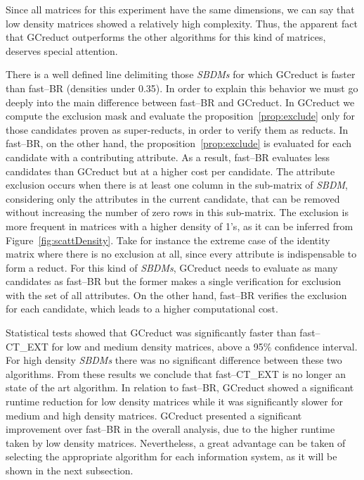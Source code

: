 \documentclass[authoryear,preprint,review,12pt]{elsarticle}
\begin{document}
	Since all matrices for this experiment have the same dimensions, we can say that low density
	matrices showed a relatively high complexity. Thus, the apparent fact that GCreduct outperforms 
	the other algorithms for this kind of matrices, deserves special attention. 
		
	There is a well defined line delimiting those \textit{SBDMs} for which GCreduct is faster than fast--BR (densities under 0.35). In order to explain this behavior we must go deeply into the main difference between fast--BR and GCreduct. In GCreduct we compute the exclusion mask and evaluate the proposition~\ref{prop:exclude} only for those candidates proven as super-reducts, in order to verify them as reducts. In fast--BR, on the other hand, the proposition~\ref{prop:exclude} is evaluated for each candidate with a contributing attribute. As a result, fast--BR evaluates less candidates than GCreduct but at a higher cost per candidate. The attribute exclusion occurs when there is at least one column in the sub-matrix of \textit{SBDM}, considering only the attributes in the current candidate, that can be removed without increasing the number of zero rows in this sub-matrix. The exclusion is more frequent in matrices with a higher density of 1's, as it can be inferred from  Figure~\ref{fig:scattDensity}. Take for instance the extreme case of the identity matrix where there is no exclusion at all, since every attribute is indispensable to form a reduct. For this kind of \textit{SBDMs}, GCreduct needs to evaluate as many candidates as fast--BR but the former makes a single verification for exclusion with the set of all attributes. On the other hand, fast--BR verifies the exclusion for each candidate, which leads to a higher computational cost.
	
	Statistical tests showed that GCreduct was significantly faster than fast--CT\_EXT for low and medium density matrices, above a 95\% confidence interval. For high density \textit{SBDMs} there was no significant difference between these two algorithms. From these results we conclude that fast--CT\_EXT is no longer an state of the art algorithm. In relation to fast--BR, GCreduct showed a significant runtime reduction for low density matrices while it was significantly slower for medium and high density matrices. GCreduct presented a significant improvement over fast--BR in the overall analysis, due to the higher runtime taken by low density matrices. Nevertheless, a great advantage can be taken of selecting the appropriate algorithm for each information system, as it will be shown in the next subsection. 
\end{document}
